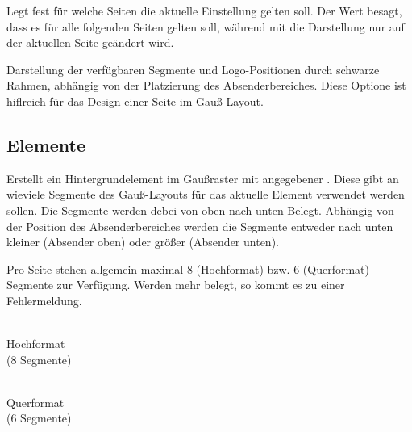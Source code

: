 Legt fest für welche Seiten die aktuelle Einstellung gelten soll.
Der Wert  besagt, dass es für alle folgenden Seiten gelten soll,
während mit  die Darstellung nur auf der aktuellen Seite geändert 
wird.

\begin{Declaration}
\end{Declaration}

Darstellung der verfügbaren Segmente und Logo-Positionen durch schwarze Rahmen, abhängig von der Platzierung des Absenderbereiches.
Diese Optione ist hiflreich für das Design einer Seite im Gauß-Layout.


\subsection{Elemente}

\begin{Declaration}
\end{Declaration}

Erstellt ein Hintergrundelement im Gaußraster mit angegebener .
Diese gibt an wieviele Segmente des Gauß-Layouts für das aktuelle Element
verwendet werden sollen.
Die Segmente werden debei von oben nach unten Belegt.
Abhängig von der Position des Absenderbereiches werden die Segmente
entweder nach unten kleiner (Absender oben) oder größer (Absender unten).

\noindent\begin{minipage}{0.4\textwidth}
Pro Seite stehen allgemein maximal 8 (Hochformat) bzw. 6 (Querformat)
Segmente zur Verfügung. Werden mehr belegt, so kommt es zu einer Fehlermeldung.
\end{minipage}
\begin{minipage}{0.6\textwidth}\centering
\begin{minipage}[b]{0.4\textwidth}\centering
{}\\
Hochformat\\ (8 Segmente)
\end{minipage}
\begin{minipage}[b]{0.45\textwidth}\centering
{}\\
Querformat\\ (6 Segmente)
\end{minipage}
\end{minipage}
\vspace*{0pt}


